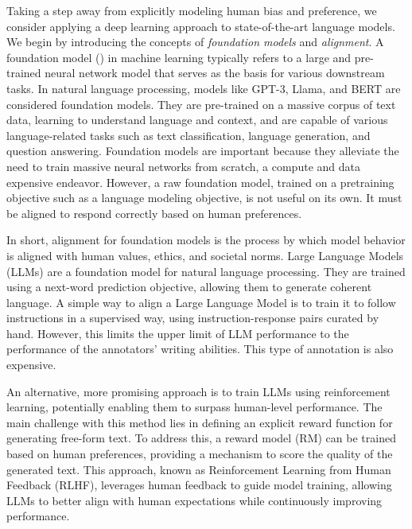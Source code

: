 \documentclass[
  letterpaper,
  numbers=noenddot,
  DIV=11]{scrreprt}
\theoremstyle{definition}
\theoremstyle{plain}
\theoremstyle{plain}
\theoremstyle{remark}
\begin{document}
Taking a step away from explicitly modeling human bias and preference,
we consider applying a deep learning approach to state-of-the-art
language models. We begin by introducing the concepts of
\emph{foundation models} and \emph{alignment}. A foundation model
() in machine learning
typically refers to a large and pre-trained neural network model that
serves as the basis for various downstream tasks. In natural language
processing, models like GPT-3, Llama, and BERT are considered foundation
models. They are pre-trained on a massive corpus of text data, learning
to understand language and context, and are capable of various
language-related tasks such as text classification, language generation,
and question answering. Foundation models are important because they
alleviate the need to train massive neural networks from scratch, a
compute and data expensive endeavor. However, a raw foundation model,
trained on a pretraining objective such as a language modeling
objective, is not useful on its own. It must be aligned to respond
correctly based on human preferences.

In short, alignment for foundation models is the process by which model
behavior is aligned with human values, ethics, and societal norms. Large
Language Models (LLMs) are a foundation model for natural language
processing. They are trained using a next-word prediction objective,
allowing them to generate coherent language. A simple way to align a
Large Language Model is to train it to follow instructions in a
supervised way, using instruction-response pairs curated by hand.
However, this limits the upper limit of LLM performance to the
performance of the annotators' writing abilities. This type of
annotation is also expensive.

An alternative, more promising approach is to train LLMs using
reinforcement learning, potentially enabling them to surpass human-level
performance. The main challenge with this method lies in defining an
explicit reward function for generating free-form text. To address this,
a reward model (RM) can be trained based on human preferences, providing
a mechanism to score the quality of the generated text. This approach,
known as Reinforcement Learning from Human Feedback (RLHF), leverages
human feedback to guide model training, allowing LLMs to better align
with human expectations while continuously improving performance.
\end{document}
